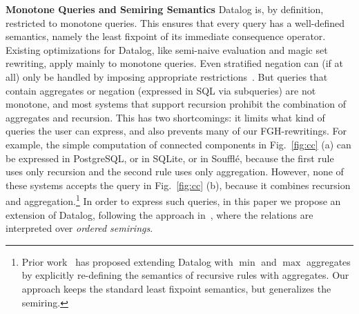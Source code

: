 

{\bf Monotone Queries and Semiring Semantics} Datalog is, by
definition, restricted to monotone queries.  This ensures that every
query has a well-defined semantics, namely the least fixpoint of its
immediate consequence operator.  Existing optimizations for Datalog,
like semi-naive evaluation and magic set rewriting, apply mainly to
monotone queries. Even stratified negation can (if at all)
only be handled by imposing appropriate restrictions~\cite{DBLP:journals/corr/abs-1909-08246}.
But queries that contain aggregates or negation
(expressed in SQL via subqueries) are not monotone, and most systems
that support recursion prohibit the combination of aggregates and
recursion.  This has two shortcomings: it limits what kind of queries
the user can express, and also prevents many of our FGH-rewritings.
For example, the simple computation of connected components in
Fig.~\ref{fig:cc} (a) can be expressed in PostgreSQL, or in SQLite, or
in Soufflé,
because the first rule uses
only recursion and the second rule uses only aggregation.  However,
none of these systems accepts the query in Fig.~\ref{fig:cc} (b),
because it combines recursion and aggregation.\footnote{Prior
  work~\cite{DBLP:conf/pods/GangulyGZ91,DBLP:journals/tkde/SeoGL15}
  has proposed extending Datalog with $\min$ and $\max$ aggregates by
  explicitly re-defining the semantics of recursive rules with
  aggregates.  Our approach keeps the standard least fixpoint
  semantics, but generalizes the semiring.}  In order to express such
queries, in this paper we propose an extension of Datalog, following
the approach in~\cite{DBLP:conf/pods/GreenKT07}, where the relations
are interpreted over {\em ordered semirings}.

